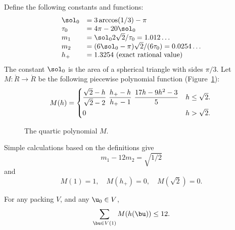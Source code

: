 
Define the following constants and functions: 
\begin{equation}\label{eqn:m-def}
\begin{array}{lll}
\sol_0 &= 3\arccos(1/3)-\pi\\
\tau_0 &= 4\pi  - 20\sol_0\\
m_1 &= \sol_0 2\sqrt2/\tau_0 = 1.012\ldots \\ %
m_2  &=  (6\sol_0- \pi)\sqrt2/(6 \tau_0) = 0.0254\ldots\\ %
h_+ &= 1.3254 \hbox{~(exact rational value)}
\end{array}
\end{equation}
The constant $\sol_0$
is the area of a spherical triangle with sides $\pi/3$.
Let $M:\ring{R}\to\ring{R}$ 
be the following piecewise polynomial function (Figure~\ref{fig:M}):
\begin{equation}\label{eqn:M}
M(h) =
\begin{cases}
\dfrac{\sqrt2-h}{\sqrt2-2}~ \dfrac{h_+-h}{h_+-1} ~\dfrac{17 h - 9 h^2 - 3}{5} & h \le \sqrt2.\vspace{3pt} \\
0 & h >\sqrt2.
\end{cases}
\\
\end{equation}
\begin{figure}[htb]
\centering
{}
\caption{The quartic polynomial $M$.}
\label{fig:M}
\end{figure}

Simple calculations based on the definitions give
\begin{equation}\label{eqn:km}m_1 - 12m_2 = \sqrt{1/2}\end{equation}
and
\begin{equation}M(1) = 1,\quad M(h_+)=0,\quad M(\sqrt2) =0.\end{equation}


\begin{conjecture}[Marchal]\label{conj:m1} For any packing $ V$, and
any $ \u_0\in V$,
\begin{displaymath}
\sum_{\bu\in V(1)} M(h(\bu)) \le 12.
\end{displaymath}
\end{conjecture}

